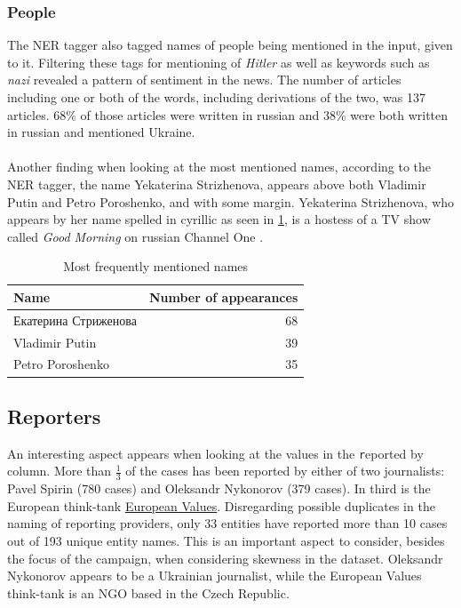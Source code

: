 \documentclass{article}
\begin{document}
\subsubsection{People}
The NER tagger also tagged names of people being mentioned in the input, given to it. Filtering these tags for mentioning of {\it Hitler} as well as keywords such as {\it nazi} revealed a pattern of sentiment in the news. The number of articles including one or both of the words, including derivations of the two, was 137 articles. 68\% of those articles were written in russian and 38\% were both written in russian and mentioned Ukraine. 
\\\\
Another finding when looking at the most mentioned names, according to the NER tagger, the name Yekaterina Strizhenova, appears above both Vladimir Putin and Petro Poroshenko, and with some margin. Yekaterina Strizhenova, who appears by her name spelled in cyrillic as seen in \cref{fig:most_mentioned_people}, is a hostess of a TV show called {\it Good Morning} on russian Channel One \cite{good_morning_russia_host}.
\begin{table}[H]
\caption{Most frequently mentioned names}
\label{fig:most_mentioned_people}
\centering
\begin{tabular}{l r}
    {\bf Name} & {\bf Number of appearances} \\ \hline
    Екатерина Стриженова &   68 \\
    Vladimir Putin   & 39 \\
    Petro Poroshenko & 35 \\
\end{tabular}
\end{table} 


\subsection{Reporters}
An interesting aspect appears when looking at the values in the {\texttt reported by} column. More than $\frac{1}{3}$ of the cases has been reported by either of two journalists: Pavel Spirin (780 cases) and Oleksandr Nykonorov (379 cases). In third is the European think-tank \href{http://europeanvalues.net/kremlinwatch}{European Values}. Disregarding possible duplicates in the naming of reporting providers, only 33 entities have reported more than 10 cases out of 193 unique entity names. This is an important aspect to consider, besides the focus of the campaign, when considering skewness in the dataset. Oleksandr Nykonorov appears to be a Ukrainian journalist, while the European Values think-tank is an NGO based in the Czech Republic.
\end{document}
